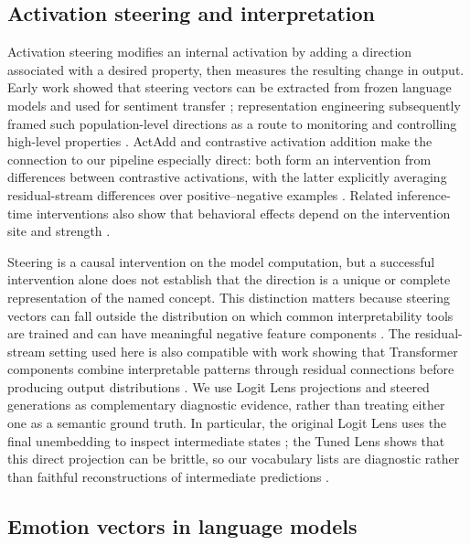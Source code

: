 \subsection{Activation steering and interpretation}

Activation steering modifies an internal activation by adding a direction
associated with a desired property, then measures the resulting change in
output.  Early work showed that steering vectors can be extracted from frozen
language models and used for sentiment transfer \cite{subramani_latent_2022};
representation engineering subsequently framed such population-level
directions as a route to monitoring and controlling high-level properties
\cite{zou_representation_2023}.  ActAdd and contrastive activation addition
make the connection to our pipeline especially direct: both form an
intervention from differences between contrastive activations, with the latter
explicitly averaging residual-stream differences over positive--negative
examples \cite{turner_activation_2023,panickssery_caa_2023}.  Related
inference-time interventions also show that behavioral effects depend on the
intervention site and strength \cite{li_inference_2023}.

Steering is a causal intervention on the model computation, but a successful
intervention alone does not establish that the direction is a unique or
complete representation of the named concept.  This distinction matters
because steering vectors can fall outside the distribution on which common
interpretability tools are trained and can have meaningful negative feature
components \cite{mayne_can_2024}.  The residual-stream setting used here is
also compatible with work showing that Transformer components combine
interpretable patterns through residual connections before producing output
distributions \cite{geva_transformer_2021}.  We use Logit Lens projections and
steered generations as complementary diagnostic evidence, rather than treating
either one as a semantic ground truth.  In particular, the original Logit Lens
uses the final unembedding to inspect intermediate states
\cite{nostalgebraist_interpreting_2020}; the Tuned Lens shows that this direct
projection can be brittle, so our vocabulary lists are diagnostic rather than
faithful reconstructions of intermediate predictions \cite{belrose_tuned_2023}.

\subsection{Emotion vectors in language models}

